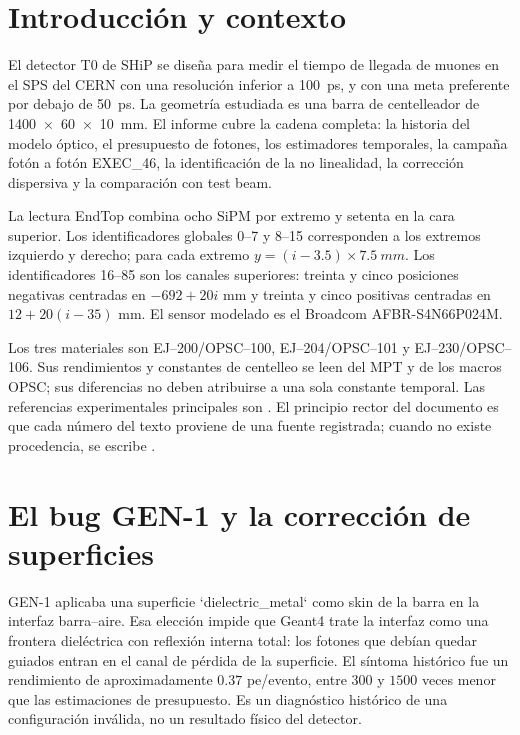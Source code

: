 \chapter{Introducción y contexto}
El detector T0 de SHiP se diseña para medir el tiempo de llegada de muones en el SPS del CERN con una resolución inferior a \SI{100}{ps}, y con una meta preferente por debajo de \SI{50}{ps}. La geometría estudiada es una barra de centelleador de \SI{1400x60x10}{mm}. El informe cubre la cadena completa: la historia del modelo óptico, el presupuesto de fotones, los estimadores temporales, la campaña fotón a fotón EXEC\_46, la identificación de la no linealidad, la corrección dispersiva y la comparación con test beam.

La lectura EndTop combina ocho SiPM por extremo y setenta en la cara superior. Los identificadores globales 0--7 y 8--15 corresponden a los extremos izquierdo y derecho; para cada extremo $y=(i-3.5)\times\SI{7.5}{mm}$. Los identificadores 16--85 son los canales superiores: treinta y cinco posiciones negativas centradas en $-692+20i$ mm y treinta y cinco positivas centradas en $12+20(i-35)$ mm. El sensor modelado es el Broadcom AFBR-S4N66P024M.


Los tres materiales son EJ--200/OPSC--100, EJ--204/OPSC--101 y EJ--230/OPSC--106. Sus rendimientos y constantes de centelleo se leen del MPT y de los macros OPSC; sus diferencias no deben atribuirse a una sola constante temporal. Las referencias experimentales principales son \cite{Betancourt2020,Blondel2018,Betancourt2017}. El principio rector del documento es que cada número del texto proviene de una fuente registrada; cuando no existe procedencia, se escribe \NOTAVAILABLE.

\chapter{El bug GEN-1 y la corrección de superficies}
GEN-1 aplicaba una superficie `dielectric\_metal` como skin de la barra en la interfaz barra--aire. Esa elección impide que Geant4 trate la interfaz como una frontera dieléctrica con reflexión interna total: los fotones que debían quedar guiados entran en el canal de pérdida de la superficie. El síntoma histórico fue un rendimiento de aproximadamente $0.37$ pe/evento, entre $300$ y $1500$ veces menor que las estimaciones de presupuesto. Es un diagnóstico histórico de una configuración inválida, no un resultado físico del detector.

